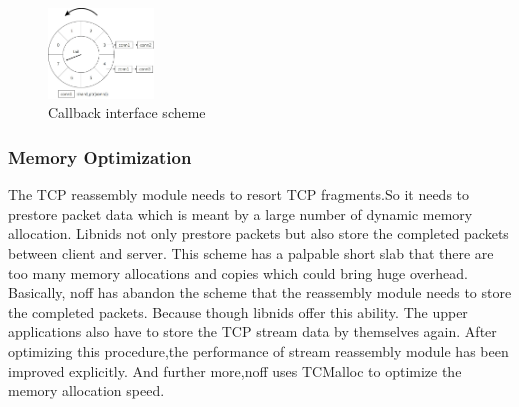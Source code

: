 \documentclass[conference]{IEEEtran}
\begin{document}
\begin{figure}[htbp]
  \centering
  \includegraphics[width=0.25\textwidth]{./picture/Figure16.jpg}
  \caption{Callback interface scheme}
  \label{fig:5}
\end{figure}
\subsubsection{Memory Optimization}
The TCP reassembly module needs to resort TCP fragments.So it needs to prestore packet data which is meant by a large number of dynamic memory allocation. Libnids not only prestore packets but also store the completed packets between client and server. This scheme has a palpable short slab that there are too many memory allocations and copies which could bring huge overhead.
\newline\indent Basically, noff has abandon the scheme that the reassembly module needs to store the completed packets. Because though libnids offer this ability. The upper applications also have to store the TCP stream data by themselves again. After optimizing this procedure,the performance of stream reassembly module has been improved explicitly.
And further more,noff uses TCMalloc to optimize the memory allocation speed.
\end{document}
